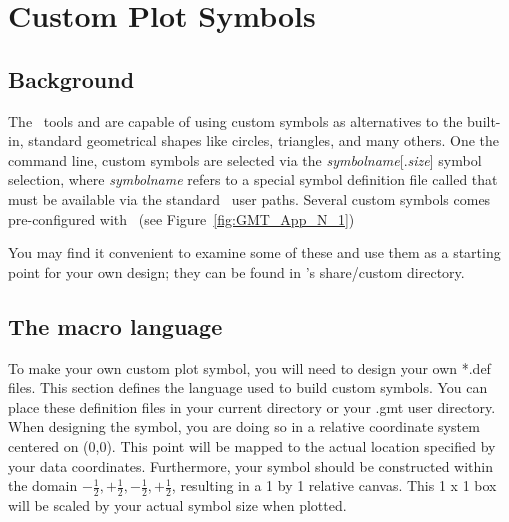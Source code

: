 %
%
\chapter{Custom Plot Symbols}
\label{app:N}

\section{Background}

The \GMT\ tools  and  are capable of using
custom symbols as alternatives to the built-in, standard geometrical shapes
like circles, triangles, and many others.  One the command line, custom
symbols are selected via the \emph{symbolname}[.\emph{size}] symbol
selection, where \emph{symbolname} refers to a special symbol definition
file called  that must be available via the standard
\GMT\ user paths.  Several custom symbols comes pre-configured with \GMT\
(see Figure~\ref{fig:GMT_App_N_1})


You may find it convenient to examine some of these and use them as a starting
point for your own design; they can be found in \GMT's share/custom directory.

% 
\section{The macro language}

To make your own custom plot symbol, you will need to design your own *.def files.
This section defines the language used to build custom symbols.  You can place these
definition files in your current directory or your .gmt user directory.  When designing
the symbol, you are doing so in a relative coordinate system centered on (0,0).  This point
will be mapped to the actual location specified by your data coordinates.  Furthermore,
your symbol should be constructed within the domain ${-\frac{1}{2},+\frac{1}{2},-\frac{1}{2},+\frac{1}{2}}$,
resulting in a 1 by 1 relative canvas.  This 1 x 1 box will be scaled by your actual
symbol size when plotted.

